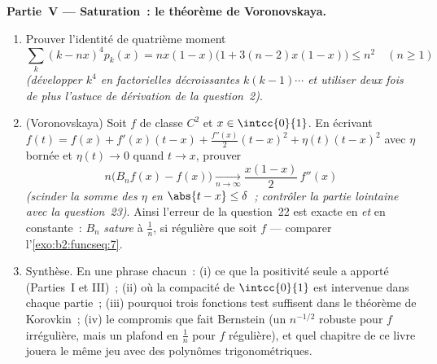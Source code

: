 \begin{problem}
\medskip
\noindent\textbf{Partie~V --- Saturation~: le théorème de
Voronovskaya.}
\begin{enumerate}[resume]
  \item Prouver l'identité de quatrième moment
        \[
        \sum_k (k - nx)^4 p_k(x)
        = nx(1-x)\bigl(1 + 3(n-2)x(1-x)\bigr) \leq n^2
        \quad (n \geq 1)
        \]
        \emph{(développer $k^4$ en factorielles décroissantes
        $k(k-1)\cdots$ et utiliser deux fois de plus l'astuce de
        dérivation de la question~2)}.
  \item (Voronovskaya) Soit $f$ de classe $C^2$ et $x \in
        \intcc{0}{1}$. En écrivant $f(t) = f(x) + f'(x)(t-x) +
        \frac{f''(x)}2(t-x)^2 + \eta(t)(t-x)^2$ avec $\eta$
        bornée et $\eta(t) \to 0$ quand $t \to x$, prouver
        \[
        n\bigl(B_nf(x) - f(x)\bigr)
        \xrightarrow[n\to\infty]{}
        \frac{x(1-x)}{2}\,f''(x)
        \]
        \emph{(scinder la somme des $\eta$ en $\abs{t - x} \leq
        \delta$~; contrôler la partie lointaine avec la question~23)}.
        Ainsi l'erreur de la question~22 est exacte en 
        \emph{et} en constante~: $B_n$ \emph{sature} à $\frac1n$, si
        régulière que soit $f$ --- comparer
        l'\cref{exo:b2:funcseq:7}.
  \item Synthèse. En une phrase chacun~: (i) ce que la positivité
        seule a apporté (Parties~I et III)~; (ii) où la compacité
        de $\intcc{0}{1}$ est intervenue dans chaque partie~; (iii)
        pourquoi trois fonctions test suffisent dans le théorème de
        Korovkin~; (iv) le compromis que fait Bernstein (un
        $n^{-1/2}$ robuste pour $f$ irrégulière, mais un plafond en
        $\frac1n$ pour $f$ régulière), et quel chapitre de ce livre
        jouera le même jeu avec des polynômes trigonométriques.
\end{enumerate}
\end{problem}
